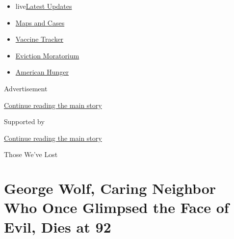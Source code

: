 \begin{itemize}
\tightlist
\item
  live\href{https://www.nytimes3xbfgragh.onion/2020/09/08/world/covid-19-coronavirus.html?name=promo-coronavirus-obits\&region=TOP_BANNER\&block=storyline_menu_recirc\&action=click\&pgtype=Article\&impression_id=0dd7bcd1-f1d2-11ea-aea1-c3876f91f510\&variant=undefined}{Latest
  Updates}
\item
  \href{https://www.nytimes3xbfgragh.onion/interactive/2020/us/coronavirus-us-cases.html?name=promo-coronavirus-obits\&region=TOP_BANNER\&block=storyline_menu_recirc\&action=click\&pgtype=Article\&impression_id=0dd7bcd2-f1d2-11ea-aea1-c3876f91f510\&variant=undefined}{Maps
  and Cases}
\item
  \href{https://www.nytimes3xbfgragh.onion/interactive/2020/science/coronavirus-vaccine-tracker.html?name=promo-coronavirus-obits\&region=TOP_BANNER\&block=storyline_menu_recirc\&action=click\&pgtype=Article\&impression_id=0dd7e3e0-f1d2-11ea-aea1-c3876f91f510\&variant=undefined}{Vaccine
  Tracker}
\item
  \href{https://www.nytimes3xbfgragh.onion/2020/09/02/your-money/eviction-moratorium-covid.html?name=promo-coronavirus-obits\&region=TOP_BANNER\&block=storyline_menu_recirc\&action=click\&pgtype=Article\&impression_id=0dd7e3e1-f1d2-11ea-aea1-c3876f91f510\&variant=undefined}{Eviction
  Moratorium}
\item
  \href{https://www.nytimes3xbfgragh.onion/interactive/2020/09/02/magazine/food-insecurity-hunger-us.html?name=promo-coronavirus-obits\&region=TOP_BANNER\&block=storyline_menu_recirc\&action=click\&pgtype=Article\&impression_id=0dd7e3e2-f1d2-11ea-aea1-c3876f91f510\&variant=undefined}{American
  Hunger}
\end{itemize}

Advertisement

\protect\hyperlink{after-top}{Continue reading the main story}

Supported by

\protect\hyperlink{after-sponsor}{Continue reading the main story}

Those We've Lost

\hypertarget{george-wolf-caring-neighbor-who-once-glimpsed-the-face-of-evil-dies-at-92}{%
\section{George Wolf, Caring Neighbor Who Once Glimpsed the Face of
Evil, Dies at
92}\label{george-wolf-caring-neighbor-who-once-glimpsed-the-face-of-evil-dies-at-92}}

